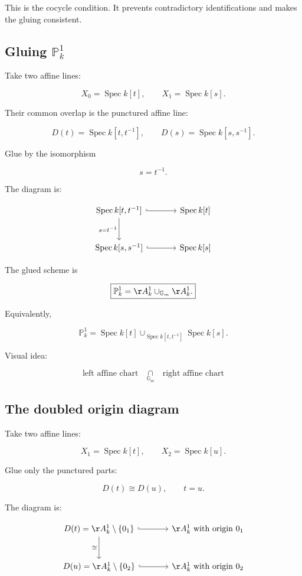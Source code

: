 \documentclass[12pt,a4paper]{article}
\newcommand{\GG}{\mathbb G}
\newcommand{\PP}{\mathbb P}
\newcommand{\Spec}{\operatorname{Spec}}
\theoremstyle{notespace}
\begin{document}
This is the cocycle condition. It prevents contradictory identifications and makes the gluing consistent.

\subsection{Gluing \(\PP^1_k\)}

Take two affine lines:

\[
X_0=\Spec k[t],
\qquad
X_1=\Spec k[s].
\]

Their common overlap is the punctured affine line:

\[
D(t)=\Spec k[t,t^{-1}],
\qquad
D(s)=\Spec k[s,s^{-1}].
\]

Glue by the isomorphism

\[
s=t^{-1}.
\]

The diagram is:

\[
\begin{tikzcd}[column sep=large,row sep=large]
	\Spec k[t,t^{-1}]
	\arrow[r,hook]
	\arrow[d,"s=t^{-1}"']
	&
	\Spec k[t]
	\\
	\Spec k[s,s^{-1}]
	\arrow[r,hook]
	&
	\Spec k[s]
\end{tikzcd}
\]

The glued scheme is

\[
\boxed{
	\PP^1_k
	=
	\AA^1_k
	\cup_{\GG_m}
	\AA^1_k.
}
\]

Equivalently,

\[
\boxed{
	\PP^1_k
	=
	\Spec k[t]
	\cup_{\Spec k[t,t^{-1}]}
	\Spec k[s].
}
\]

Visual idea:

\[
\boxed{
	\text{left affine chart}
}
\quad
\underset{\GG_m}{\cap}
\quad
\boxed{
	\text{right affine chart}
}
\]

\subsection{The doubled origin diagram}

Take two affine lines:

\[
X_1=\Spec k[t],
\qquad
X_2=\Spec k[u].
\]

Glue only the punctured parts:

\[
D(t)\cong D(u),
\qquad
t=u.
\]

The diagram is:

\[
\begin{tikzcd}[column sep=large,row sep=large]
	D(t)=\AA^1_k\setminus\{0_1\}
	\arrow[r,hook]
	\arrow[d,"\cong"']
	&
	\AA^1_k\text{ with origin }0_1
	\\
	D(u)=\AA^1_k\setminus\{0_2\}
	\arrow[r,hook]
	&
	\AA^1_k\text{ with origin }0_2
\end{tikzcd}
\]
\end{document}
